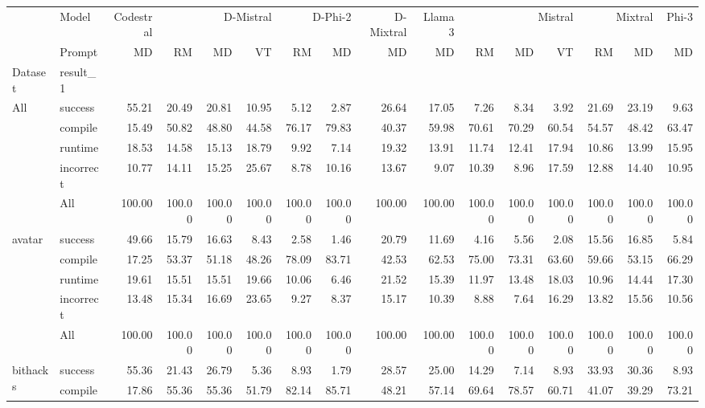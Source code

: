 \begin{tabular}{llrrrrrrrrrrrrrr}
\toprule
 & Model & Codestral & \multicolumn{3}{r}{D-Mistral} & \multicolumn{2}{r}{D-Phi-2} & D-Mixtral & Llama 3 & \multicolumn{3}{r}{Mistral} & \multicolumn{2}{r}{Mixtral} & Phi-3 \\
 & Prompt & MD & RM & MD & VT & RM & MD & MD & MD & RM & MD & VT & RM & MD & MD \\
Dataset & result_1 &  &  &  &  &  &  &  &  &  &  &  &  &  &  \\
\midrule
\multirow[t]{5}{*}{All} & success & 55.21 & 20.49 & 20.81 & 10.95 & 5.12 & 2.87 & 26.64 & 17.05 & 7.26 & 8.34 & 3.92 & 21.69 & 23.19 & 9.63 \\
 & compile & 15.49 & 50.82 & 48.80 & 44.58 & 76.17 & 79.83 & 40.37 & 59.98 & 70.61 & 70.29 & 60.54 & 54.57 & 48.42 & 63.47 \\
 & runtime & 18.53 & 14.58 & 15.13 & 18.79 & 9.92 & 7.14 & 19.32 & 13.91 & 11.74 & 12.41 & 17.94 & 10.86 & 13.99 & 15.95 \\
 & incorrect & 10.77 & 14.11 & 15.25 & 25.67 & 8.78 & 10.16 & 13.67 & 9.07 & 10.39 & 8.96 & 17.59 & 12.88 & 14.40 & 10.95 \\
 & All & 100.00 & 100.00 & 100.00 & 100.00 & 100.00 & 100.00 & 100.00 & 100.00 & 100.00 & 100.00 & 100.00 & 100.00 & 100.00 & 100.00 \\
\cline{1-16}
\multirow[t]{5}{*}{avatar} & success & 49.66 & 15.79 & 16.63 & 8.43 & 2.58 & 1.46 & 20.79 & 11.69 & 4.16 & 5.56 & 2.08 & 15.56 & 16.85 & 5.84 \\
 & compile & 17.25 & 53.37 & 51.18 & 48.26 & 78.09 & 83.71 & 42.53 & 62.53 & 75.00 & 73.31 & 63.60 & 59.66 & 53.15 & 66.29 \\
 & runtime & 19.61 & 15.51 & 15.51 & 19.66 & 10.06 & 6.46 & 21.52 & 15.39 & 11.97 & 13.48 & 18.03 & 10.96 & 14.44 & 17.30 \\
 & incorrect & 13.48 & 15.34 & 16.69 & 23.65 & 9.27 & 8.37 & 15.17 & 10.39 & 8.88 & 7.64 & 16.29 & 13.82 & 15.56 & 10.56 \\
 & All & 100.00 & 100.00 & 100.00 & 100.00 & 100.00 & 100.00 & 100.00 & 100.00 & 100.00 & 100.00 & 100.00 & 100.00 & 100.00 & 100.00 \\
\cline{1-16}
\multirow[t]{5}{*}{bithacks} & success & 55.36 & 21.43 & 26.79 & 5.36 & 8.93 & 1.79 & 28.57 & 25.00 & 14.29 & 7.14 & 8.93 & 33.93 & 30.36 & 8.93 \\
 & compile & 17.86 & 55.36 & 55.36 & 51.79 & 82.14 & 85.71 & 48.21 & 57.14 & 69.64 & 78.57 & 60.71 & 41.07 & 39.29 & 73.21 \\

\end{tabular}
